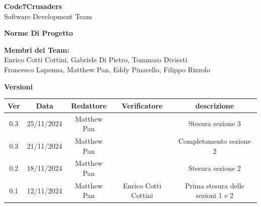 \documentclass{article}
\begin{document}
\begin{titlepage}
    \vspace{1cm}
    
    {\Huge \textbf{Code7Crusaders}}\\
    \vspace{0.5cm}
    {\Large Software Development Team}\\
    \vspace{2cm}
    
    \large \textbf{Norme Di Progetto}
    \vspace{3.9cm}

    \textbf{Membri del Team:}\\
    Enrico Cotti Cottini, Gabriele Di Pietro, Tommaso Diviesti \\
    Francesco Lapenna, Matthew Pan, Eddy Pinarello, Filippo Rizzolo \\
    \vspace{0.5cm}
    
    \vspace{1cm}
\end{titlepage}



\newpage
\begin{center}
    \textbf{Versioni}
    \\
    \vspace{0.3cm}
    \begin{tabular}{|c|c|c|c|c|}
        \hline
        \textbf{Ver} & \textbf{Data} & \textbf{Redattore} & \textbf{Verificatore} & \textbf{descrizione}\\
        \hline
        0.3 & 25/11/2024 & Matthew Pan &                      & Stesura sezione 3\\
        0.3 & 21/11/2024 & Matthew Pan &                      & Completamento sezione 2\\
        0.2 & 18/11/2024 & Matthew Pan &                      & Stesura sezione 2\\
        0.1 & 12/11/2024 & Matthew Pan & Enrico Cotti Cottini & Prima stesura delle sezioni 1 e 2\\
        \hline
    \end{tabular}
\end{center}


\newpage
\tableofcontents
\listoftables
\listoffigures

 
\newpage


\newpage


\newpage


\newpage

\end{document}
